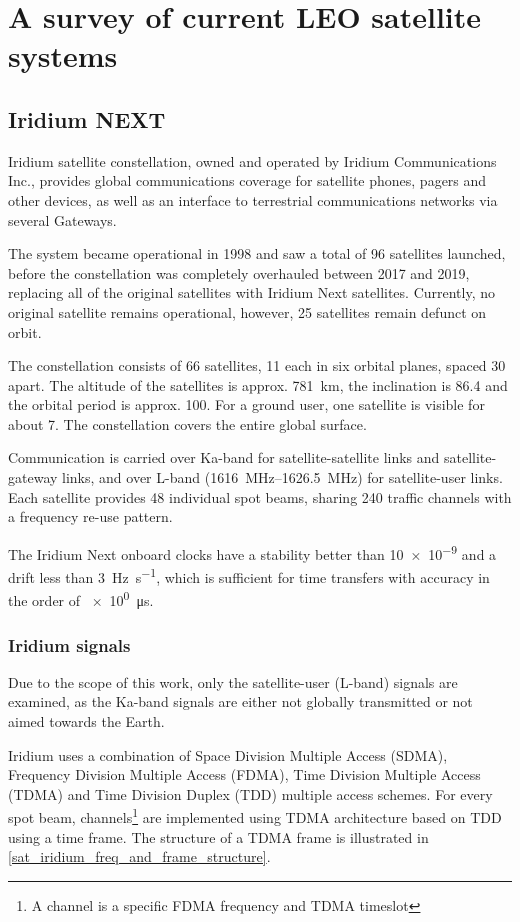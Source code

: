 \chapter{A survey of current LEO satellite systems}

\section{Iridium NEXT}
Iridium satellite constellation, owned and operated by Iridium Communications Inc., provides global communications coverage for satellite phones, pagers and other devices, as well as an interface to terrestrial communications networks via several Gateways.

The system became operational in 1998 and saw a total of 96 satellites launched, before the constellation was completely overhauled between 2017 and 2019, replacing all of the original satellites with Iridium Next satellites. Currently, no original satellite remains operational, however, 25 satellites remain defunct on orbit\cite{sat06}.

The constellation consists of 66 satellites, 11 each in six orbital planes, spaced \qty{30}{\deg} apart. The altitude of the satellites is approx. \qty{781}{\km}, the inclination is \qty{86.4}{\deg} and the orbital period is approx. \qty{100}{\min}. For a ground user, one satellite is visible for about \qty{7}{\min}. The constellation covers the entire global surface\cite{sat01}.

Communication is carried over Ka-band for satellite-satellite links and satellite-gateway links, and over L-band (\qtyrange{1616}{1626.5}{\mega\hertz}) for satellite-user links. Each satellite provides 48 individual spot beams, sharing 240 traffic channels with a frequency re-use pattern\cite{sat07}.

The Iridium Next onboard clocks have a stability better than \num{10e-9} and a drift less than \qty{3}{\hertz\per\s}, which is sufficient for time transfers with accuracy in the order of \qty{e0}{\micro\s}\cite{sop11}.

\subsection{Iridium signals}
Due to the scope of this work, only the satellite-user (L-band) signals are examined, as the Ka-band signals are either not globally transmitted or not aimed towards the Earth.

Iridium uses a combination of Space Division Multiple Access (SDMA),  Frequency Division Multiple Access (FDMA), Time Division Multiple Access (TDMA) and Time Division Duplex (TDD) multiple access schemes\cite{sop11}. For every spot beam, channels\footnote{A channel is a specific FDMA frequency and TDMA timeslot\cite{sat07}} are implemented using TDMA architecture based on TDD using a time frame\cite{sop12}. The structure of a TDMA frame is illustrated in \ref{sat_iridium_freq_and_frame_structure}.

